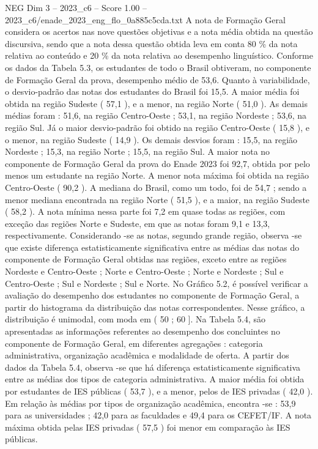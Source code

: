 \begin{textsample}{NEG Dim 3 – 2023\_c6 – Score 1.00 – 2023\_c6/enade\_2023\_eng\_flo\_0a885c5cda.txt}
A nota de Formação Geral considera os acertos nas nove questões objetivas e a nota média obtida na questão discursiva, sendo que a nota dessa questão obtida leva em conta 80 \% da nota relativa ao conteúdo e 20 \% da nota relativa ao desempenho linguístico.
Conforme os dados da Tabela 5.3, os estudantes de todo o Brasil obtiveram, no componente de Formação Geral da prova, desempenho médio de 53,6.
Quanto à variabilidade, o desvio-padrão das notas dos estudantes do Brasil foi 15,5.
A maior média foi obtida na região Sudeste ( 57,1 ), e a menor, na região Norte ( 51,0 ).
As demais médias foram : 51,6, na região Centro-Oeste ; 53,1, na região Nordeste ; 53,6, na região Sul.
Já o maior desvio-padrão foi obtido na região Centro-Oeste ( 15,8 ), e o menor, na região Sudeste ( 14,9 ).
Os demais desvios foram : 15,5, na região Nordeste ; 15,3, na região Norte ; 15,5, na região Sul.
A maior nota no componente de Formação Geral da prova do Enade 2023 foi 92,7, obtida por pelo menos um estudante na região Norte.
A menor nota máxima foi obtida na região Centro-Oeste ( 90,2 ).
A mediana do Brasil, como um todo, foi de 54,7 ; sendo a menor mediana encontrada na região Norte ( 51,5 ), e a maior, na região Sudeste ( 58,2 ).
A nota mínima nessa parte foi 7,2 em quase todas as regiões, com exceção das regiões Norte e Sudeste, em que as notas foram 9,1 e 13,3, respectivamente.
Considerando -se as notas, segundo grande região, observa -se que existe diferença estatisticamente significativa entre as médias das notas do componente de Formação Geral obtidas nas regiões, exceto entre as regiões Nordeste e Centro-Oeste ; Norte e Centro-Oeste ; Norte e Nordeste ; Sul e Centro-Oeste ; Sul e Nordeste ; Sul e Norte.
No Gráfico 5.2, é possível verificar a avaliação do desempenho dos estudantes no componente de Formação Geral, a partir do histograma da distribuição das notas correspondentes.
Nesse gráfico, a distribuição é unimodal, com moda em ( 50 ; 60 ].
Na Tabela 5.4, são apresentadas as informações referentes ao desempenho dos concluintes no componente de Formação Geral, em diferentes agregações : categoria administrativa, organização acadêmica e modalidade de oferta.
A partir dos dados da Tabela 5.4, observa -se que há diferença estatisticamente significativa entre as médias dos tipos de categoria administrativa.
A maior média foi obtida por estudantes de IES públicas ( 53,7 ), e a menor, pelos de IES privadas ( 42,0 ).
Em relação às médias por tipos de organização acadêmica, encontra -se : 53,9 para as universidades ; 42,0 para as faculdades e 49,4 para os CEFET/IF.
A nota máxima obtida pelas IES privadas ( 57,5 ) foi menor em comparação às IES públicas.

\end{textsample}
